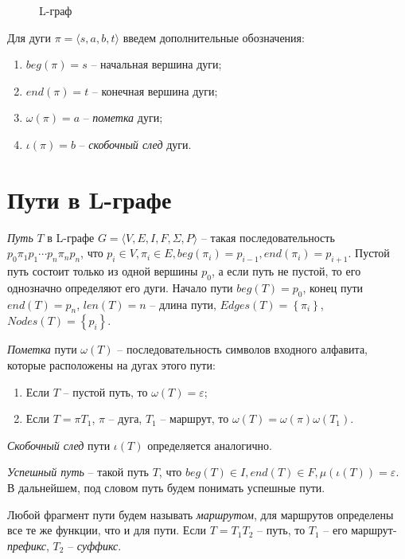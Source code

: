 \begin{figure}
    \centering
    
    \caption{L-граф}
    \label{lgraph1-expample-image}
    
\end{figure}

Для дуги $\pi = \langle s, a, b, t \rangle$ введем дополнительные обозначения:
\begin{enumerate}[label=\arabic*)]
    \item $beg(\pi) = s$ -- начальная вершина дуги;
    \item $end(\pi) = t$ -- конечная вершина дуги;
    \item $\omega(\pi) = a$ -- \emph{пометка} дуги;
    \item $\iota(\pi) = b$ -- \emph{скобочный след} дуги.
\end{enumerate}

\section{Пути в L-графе}
\emph{Путь} $T$ в L-графе $G=\langle V,E,I,F,\Sigma, P \rangle$ -- такая последовательность $p_0 \pi_1 p_1 \cdots p_n \pi_n p_n$, что 
$p_i \in V, \pi_i \in E, beg(\pi_i) = p_{i-1}, end(\pi_i) = p_{i+1}$.
Пустой путь состоит только из одной вершины $p_0$, а если путь не пустой, то его однозначно определяют его дуги.
Начало пути $beg(T) = p_0$, конец пути $end(T) = p_n$, $len(T) = n$ -- длина пути, 
$Edges(T) = \left\{ \pi_i \right\}$, $Nodes(T) = \left\{ p_i \right\}$.

\emph{Пометка} пути $\omega(T)$ -- последовательность символов входного алфавита, которые расположены на дугах этого пути:
\begin{enumerate}[label=\arabic*)]
    \item Если $T$ -- пустой путь, то $\omega(T) = \varepsilon$;
    \item Если $T = \pi T_1$, $\pi$ -- дуга, $T_1$ -- маршрут, то $\omega(T) = \omega(\pi) \omega(T_1)$.
\end{enumerate}

\emph{Скобочный след} пути $\iota(T)$ определяется аналогично.


\emph{Успешный путь} -- такой путь $T$, что $beg(T) \in I, end(T) \in F, \mu(\iota(T)) = \varepsilon$.
В дальнейшем, под словом путь будем понимать успешные пути.

Любой фрагмент пути будем называть \emph{маршрутом}, для маршрутов определены все те же функции, что и для пути.
Если $T = T_1 T_2$ -- путь, то $T_1$ -- его маршрут-\emph{префикс}, $T_2$ -- \emph{суффикс}.

